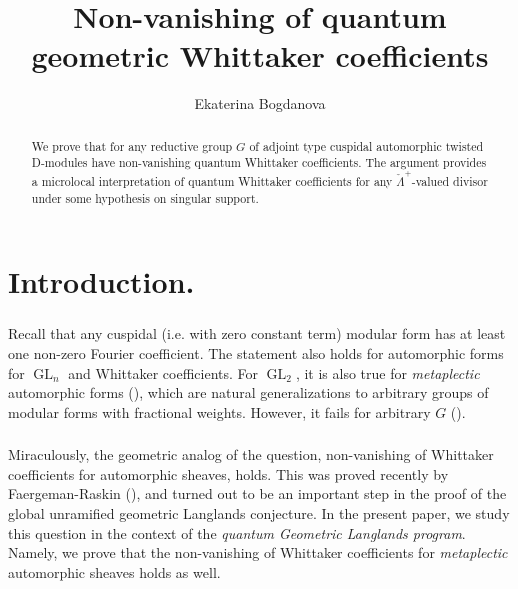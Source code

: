 \documentclass[9pt]{amsart}
\DeclareMathOperator{\GL}{{GL}}
\numberwithin{equation}{section}
\begin{document}
	
	\title[Non-vanishing of quantum geometric Whittaker coefficients]{Non-vanishing of quantum geometric Whittaker coefficients}
	
	\author[E.~Bogdanova]{Ekaterina Bogdanova}
	\address{Harvard University,  USA}
	
	\begin{abstract}
	We prove that for any reductive group $G$ of adjoint type cuspidal automorphic twisted D-modules have non-vanishing quantum Whittaker coefficients. The argument provides a  microlocal interpretation of quantum Whittaker coefficients for any $\check{\Lambda}^+$-valued divisor under some hypothesis on singular support.
	\end{abstract}
	
	\maketitle
	
	\tableofcontents
	
	\section{Introduction.}
	
		\subsubsection{} Recall that any cuspidal (i.e. with zero constant term) modular form has at least one non-zero Fourier coefficient. The statement also holds for automorphic forms for $\GL_n$ and Whittaker coefficients. For $\GL_2$, it is also true for {\it metaplectic} automorphic forms (\cite{GHPS}), which are natural generalizations to arbitrary groups of modular forms with fractional weights. However, it fails for arbitrary $G$ (\cite{HPS}). 
	
	\subsubsection{} Miraculously, the geometric analog of the question, non-vanishing  of Whittaker coefficients for automorphic sheaves, holds. This was proved recently by Faergeman-Raskin (\cite{FR}), and turned out to be an important step in the proof of the global unramified geometric Langlands conjecture. In the present paper, we study this question in the context of the {\it quantum Geometric Langlands program}. Namely, we prove that the non-vanishing  of Whittaker coefficients for {\it metaplectic} automorphic sheaves holds as well. 
	
\end{document}
